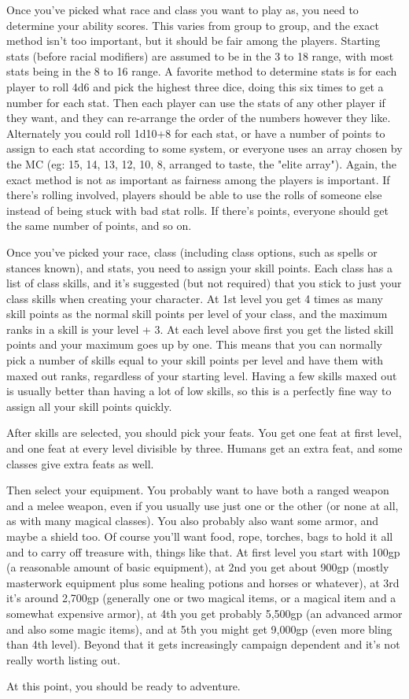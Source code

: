 Once you've picked what race and class you want to play as, you need to determine your ability scores. This varies from group to group, and the exact method isn't too important, but it should be fair among the players. Starting stats (before racial modifiers) are assumed to be in the 3 to 18 range, with most stats being in the 8 to 16 range. A favorite method to determine stats is for each player to roll 4d6 and pick the highest three dice, doing this six times to get a number for each stat. Then each player can use the stats of any other player if they want, and they can re-arrange the order of the numbers however they like. Alternately you could roll 1d10+8 for each stat, or have a number of points to assign to each stat according to some system, or everyone uses an array chosen by the MC (eg: 15, 14, 13, 12, 10, 8, arranged to taste, the "elite array"). Again, the exact method is not as important as fairness among the players is important. If there's rolling involved, players should be able to use the rolls of someone else instead of being stuck with bad stat rolls. If there's points, everyone should get the same number of points, and so on.

Once you've picked your race, class (including class options, such as spells or stances known), and stats, you need to assign your skill points. Each class has a list of class skills, and it's suggested (but not required) that you stick to just your class skills when creating your character. At 1st level you get 4 times as many skill points as the normal skill points per level of your class, and the maximum ranks in a skill is your level + 3. At each level above first you get the listed skill points and your maximum goes up by one. This means that you can normally pick a number of skills equal to your skill points per level and have them with maxed out ranks, regardless of your starting level. Having a few skills maxed out is usually better than having a lot of low skills, so this is a perfectly fine way to assign all your skill points quickly.

After skills are selected, you should pick your feats. You get one feat at first level, and one feat at every level divisible by three. Humans get an extra feat, and some classes give extra feats as well.

Then select your equipment. You probably want to have both a ranged weapon and a melee weapon, even if you usually use just one or the other (or none at all, as with many magical classes). You also probably also want some armor, and maybe a shield too. Of course you'll want food, rope, torches, bags to hold it all and to carry off treasure with, things like that. At first level you start with 100gp (a reasonable amount of basic equipment), at 2nd you get about 900gp (mostly masterwork equipment plus some healing potions and horses or whatever), at 3rd it's around 2,700gp (generally one or two magical items, or a magical item and a somewhat expensive armor), at 4th you get probably 5,500gp (an advanced armor and also some magic items), and at 5th you might get 9,000gp (even more bling than 4th level). Beyond that it gets increasingly campaign dependent and it's not really worth listing out.

At this point, you should be ready to adventure.
